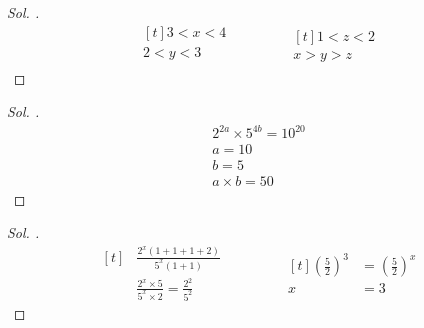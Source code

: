 \documentclass{article}
\theoremstyle{mytheoremstyle}
\theoremstyle{mytheoremstyle}
\theoremstyle{myproblemstyle}
\begin{document}
\begin{proof}[\textit{ Sol. }]
  \begin{equation*}
    \begin{aligned}[t]
      3 < x < 4\\
      2 < y < 3\\
    \end{aligned}
    \qquad\qquad
    \begin{aligned}[t]
      1 < z < 2\\
      x > y > z
    \end{aligned}
  \end{equation*}
\end{proof}

\begin{problem}[a ve b sayma sayılarıdır. $ \frac{4^a \times 5^{4b}}{100} $ sayısı 19 basamaklı en küçük doğal sayıya eşit olduğuna göre $ a \times b = ? $]
\end{problem}

\begin{proof}[\textit{ Sol. }]
  \begin{gather*}
    2^{2a} \times 5^{4b} = 10^{20}\\
    a = 10\\
    b = 5\\
    a \times b = 50
  \end{gather*}
\end{proof}

\begin{problem}[$ \frac{2^x + 2^x + 2^x + 2^{x + 1}}{5^x + 5^x} = \frac{4}{25} $ ise $ x = ? $]
\end{problem}

\begin{proof}[\textit{ Sol. }]
  \begin{equation*}
    \begin{aligned}[t]
      &\frac{2^x(1 + 1 + 1 + 2)}{5^x(1 + 1)}\\
      &\frac{2^x \times 5}{5^x \times 2} = \frac{2^2}{5^2}
    \end{aligned}
    \qquad\qquad
    \begin{aligned}[t]
      \left(\frac{5}{2}\right)^3 &= \left(\frac{5}{2}\right)^x\\
      x &= 3
    \end{aligned}
  \end{equation*}
\end{proof}

\begin{problem}[$ 4^y = 32 $, $ 4^x = 8 $ ise $ \frac{x + y}{x - y} = ? $]
\end{problem}
\end{document}
